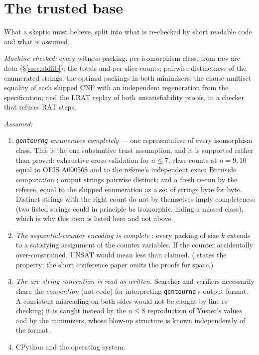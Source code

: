 \documentclass[11pt]{amsart}
\theoremstyle{plain}
\theoremstyle{definition}
\theoremstyle{remark}
\begin{document}
\section{The trusted base}\label{sec:tcb}

What a skeptic must believe, split into what is re-checked by short
readable code and what is assumed.

\emph{Machine-checked:} every witness packing, per isomorphism class,
from raw arc data (\S\ref{ssec:stdlib}); the totals and per-slice counts;
pairwise distinctness of the enumerated strings; the optimal packings in
both minimizers; the clause-multiset equality of each shipped CNF with an
independent regeneration from the specification; and the LRAT replay of
both unsatisfiability proofs, in a checker that refuses RAT steps.

\emph{Assumed:}
\begin{enumerate}
\item \emph{\texttt{gentourng} enumerates completely} --- one
representative of every isomorphism class. This is the one substantive
trust assumption, and it is supported rather than proved: exhaustive
cross-validation for $n\le7$; class counts at $n=9,10$ equal to OEIS
A000568 \cite{OEIS} and to the referee's independent exact Burnside
computation \cite{Davis54}; output strings pairwise distinct; and a
fresh re-run by the referee, equal to the shipped enumeration as a set
of strings byte for byte. Distinct strings with the right count do
not by themselves imply completeness (two listed strings could in
principle be isomorphic, hiding a missed class), which is why this item
is listed here and not above.
\item \emph{The sequential-counter encoding is complete} \cite{Sinz05}:
every packing of size $k$ extends to a satisfying assignment of the
counter variables. If the counter accidentally over-constrained, UNSAT
would mean less than claimed. (\cite{Sinz05} states the property; the
short conference paper omits the proofs for space.)
\item \emph{The arc-string convention is read as written.} Searcher and
verifiers necessarily share the \emph{convention} (not code) for
interpreting \texttt{gentourng}'s output format. A consistent
misreading on both sides would not be caught by line re-checking; it is
caught instead by the $n\le8$ reproduction of Yuster's values and by the
minimizers, whose blow-up structure is known independently of the
format.
\item CPython and the operating system.
\end{enumerate}
\end{document}

